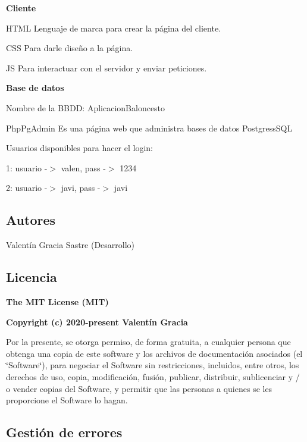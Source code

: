 {\bfseries Cliente}
\begin{DoxyItemize}
\item H\+T\+ML Lenguaje de marca para crear la página del cliente.
\item C\+SS Para darle diseño a la página.
\item JS Para interactuar con el servidor y enviar peticiones.
\end{DoxyItemize}

{\bfseries Base de datos}
\begin{DoxyItemize}
\item Nombre de la B\+B\+DD\+: Aplicacion\+Baloncesto
\item Php\+Pg\+Admin Es una página web que administra bases de datos Postgress\+S\+QL
\item Usuarios disponibles para hacer el login\+:
\item 1\+: usuario -\/$>$ valen, pass -\/$>$ 1234
\item 2\+: usuario -\/$>$ javi, pass -\/$>$ javi
\end{DoxyItemize}

\subsection*{Autores}


\begin{DoxyItemize}
\item Valentín Gracia Sastre (Desarrollo)
\end{DoxyItemize}

\subsection*{Licencia}

{\bfseries The M\+IT License (M\+IT)}

{\bfseries Copyright (c) 2020-\/present Valentín Gracia}

Por la presente, se otorga permiso, de forma gratuita, a cualquier persona que obtenga una copia de este software y los archivos de documentación asociados (el \char`\"{}\+Software\char`\"{}), para negociar el Software sin restricciones, incluidos, entre otros, los derechos de uso, copia, modificación, fusión, publicar, distribuir, sublicenciar y / o vender copias del Software, y permitir que las personas a quienes se les proporcione el Software lo hagan.

\subsection*{Gestión de errores}


